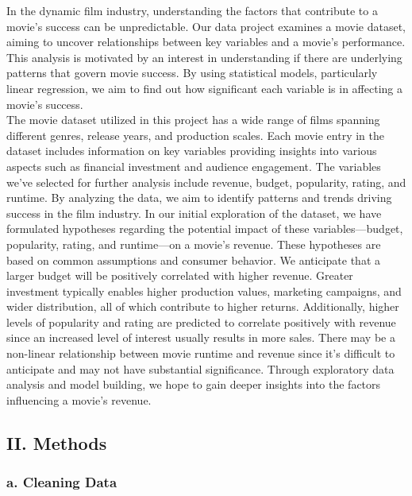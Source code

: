 \documentclass[
]{article}
\begin{document}
In the dynamic film industry, understanding the factors that contribute
to a movie's success can be unpredictable. Our data project examines a
movie dataset, aiming to uncover relationships between key variables and
a movie's performance. This analysis is motivated by an interest in
understanding if there are underlying patterns that govern movie
success. By using statistical models, particularly linear regression, we
aim to find out how significant each variable is in affecting a movie's
success.\\
The movie dataset utilized in this project has a wide range of films
spanning different genres, release years, and production scales. Each
movie entry in the dataset includes information on key variables
providing insights into various aspects such as financial investment and
audience engagement. The variables we've selected for further analysis
include revenue, budget, popularity, rating, and runtime. By analyzing
the data, we aim to identify patterns and trends driving success in the
film industry. In our initial exploration of the dataset, we have
formulated hypotheses regarding the potential impact of these
variables---budget, popularity, rating, and runtime---on a movie's
revenue. These hypotheses are based on common assumptions and consumer
behavior. We anticipate that a larger budget will be positively
correlated with higher revenue. Greater investment typically enables
higher production values, marketing campaigns, and wider distribution,
all of which contribute to higher returns. Additionally, higher levels
of popularity and rating are predicted to correlate positively with
revenue since an increased level of interest usually results in more
sales. There may be a non-linear relationship between movie runtime and
revenue since it's difficult to anticipate and may not have substantial
significance. Through exploratory data analysis and model building, we
hope to gain deeper insights into the factors influencing a movie's
revenue.

\subsection{II. Methods}\label{ii.-methods}

\subsubsection{a. Cleaning Data}\label{a.-cleaning-data}
\end{document}

